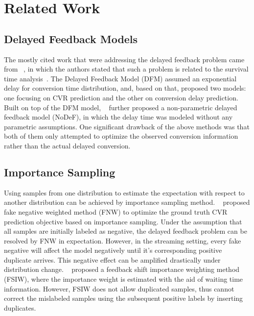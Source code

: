\documentclass[letterpaper]{article}
\begin{document}
\section{Related Work}

\subsection{Delayed Feedback Models}
The mostly cited work that were addressing the delayed feedback problem came from ~\citet{DFM}, in which the authors stated that such a problem is related to the survival time analysis~\cite{survival_time}. The Delayed Feedback Model (DFM) assumed an exponential delay for conversion time distribution, and, based on that, proposed two models: one focusing on CVR prediction and the other on conversion delay prediction. %
Built on top of the DFM model, ~\citet{npdfm} further proposed a non-parametric delayed feedback model (NoDeF), in which the delay time was modeled without any parametric assumptions. One significant drawback of the above methods was that both of them only attempted to optimize the observed conversion information rather than the actual delayed conversion.

\subsection{Importance Sampling}
Using samples from one distribution to estimate the expectation with respect to another distribution can be achieved by importance sampling method. ~\citet{FNW} proposed fake negative weighted method (FNW) to optimize the ground truth CVR prediction objective based on importance sampling. Under the assumption that all samples are initially labeled as negative, the delayed feedback problem can be resolved by FNW in expectation. However, in the streaming setting, every fake negative will affect the model negatively until it's corresponding positive duplicate arrives. This negative effect can be amplified drastically under distribution change. ~\citet{FSIW} proposed a feedback shift importance weighting method (FSIW), where the importance weight is estimated with the aid of waiting time information. However, FSIW does not allow duplicated samples, thus cannot correct the mislabeled samples using the subsequent positive labels by inserting duplicates.
\end{document}
